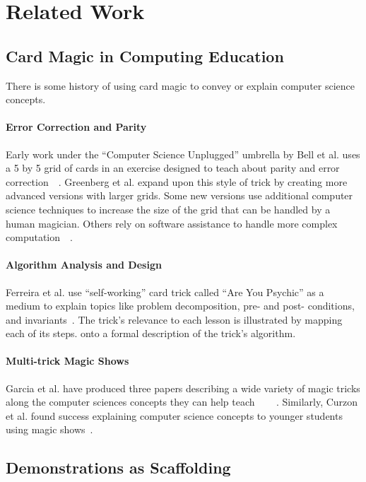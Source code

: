 \section{Related Work}
\label{SEC:related-work}

\subsection{Card Magic in Computing Education}
There is some history of using card magic to convey or explain computer science
concepts.

\paragraph{Error Correction and Parity}
Early work under the ``Computer Science Unplugged'' umbrella by Bell et al. uses
a 5 by 5 grid of cards in an exercise designed to teach about parity and
error correction~\cite{bell2009computer}~\cite{csunplugged}.
Greenberg et al. expand upon this style of trick by creating more advanced
versions with larger grids.  Some new versions use additional computer science
techniques to increase the size of the grid that can be handled by a human
magician.  Others rely on software assistance to handle more complex
computation~\cite{Greenberg2017}~\cite{Greenberg2018}.

\paragraph{Algorithm Analysis and Design}
Ferreira et al. use ``self-working'' card trick called ``Are You Psychic''
as a medium to explain topics
like problem decomposition, pre- and post- conditions, and
invariants~\cite{ferreira2014magic}.
The trick's relevance to each lesson is illustrated by
mapping each of its steps.
onto a formal description of the trick's algorithm.

\paragraph{Multi-trick Magic Shows}
Garcia et al. have produced three papers describing a wide variety of magic
tricks along the computer sciences concepts they can help
teach~\cite{garcia2012demystifying}
~\cite{garcia2013demystifying}
~\cite{garcia2016demystifying}.
Similarly, Curzon et al. found success explaining computer
science concepts to younger students using magic shows~\cite{Curzon2008}.

\subsection{Demonstrations as Scaffolding}


